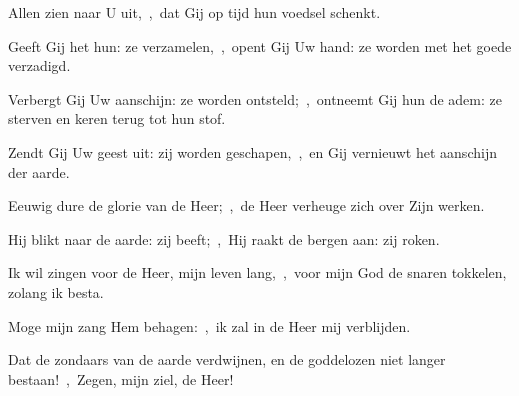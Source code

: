 \documentclass[12pt,twoside,a5paper]{article}
\begin{document}

\begin{halfparskip}
  Allen zien naar U uit,~\sep\ dat Gij op tijd hun voedsel schenkt.

  Geeft Gij het hun: ze verzamelen,~\sep\ opent Gij Uw hand: ze worden met het goede verzadigd.

  Verbergt Gij Uw aanschijn: ze worden ontsteld;~\sep\ ontneemt Gij hun de adem: ze sterven en keren terug tot hun stof.

  Zendt Gij Uw geest uit: zij worden geschapen,~\sep\ en Gij vernieuwt het aanschijn der aarde.
\end{halfparskip}


\begin{halfparskip}
  Eeuwig dure de glorie van de Heer;~\sep\ de Heer verheuge zich over Zijn werken.

  Hij blikt naar de aarde: zij beeft;~\sep\ Hij raakt de bergen aan: zij roken.

  Ik wil zingen voor de Heer, mijn leven lang,~\sep\ voor mijn God de snaren tokkelen, zolang ik besta.

  Moge mijn zang Hem behagen:~\sep\ ik zal in de Heer mij verblijden.

  Dat de zondaars van de aarde verdwijnen, en de goddelozen niet langer bestaan!~\sep\ Zegen, mijn ziel, de Heer!
\end{halfparskip}




\end{document}
